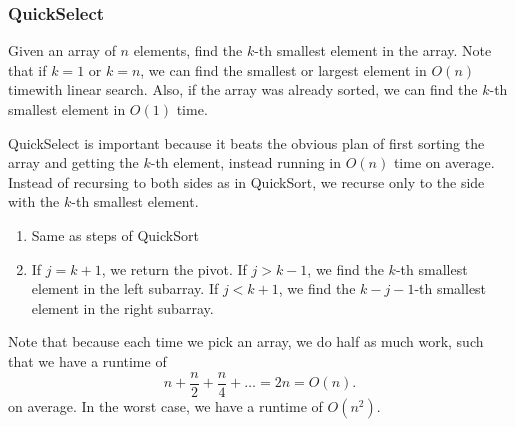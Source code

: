 \subsubsection{QuickSelect}
Given an array of \( n \) elements, find the \( k \)-th smallest element in the array. Note that if \( k=1 \) or \( k=n \), we can find the smallest or largest element in \( O(n) \) timewith linear search. Also, if the array was already sorted, we can find the \( k \)-th smallest element in \( O(1) \) time.

QuickSelect is important because it beats the obvious plan of first sorting the array and getting the \( k \)-th element, instead running in \( O(n) \) time on average. Instead of recursing to both sides as in QuickSort, we recurse only to the side with the \( k \)-th smallest element. 

\begin{enumerate}
	\item Same as steps of QuickSort
	\item If \( j=k+1 \), we return the pivot. If \( j > k-1 \), we find the \( k \)-th smallest element in the left subarray. If \( j < k+1 \), we find the \( k-j-1 \)-th smallest element in the right subarray.
\end{enumerate}

Note that because each time we pick an array, we do half as much work, such that we have a runtime of \[
	n + \frac{n}{2} + \frac{n}{4} + \ldots = 2n = O(n)
.\] on average. In the worst case, we have a runtime of \( O(n^2) \).
